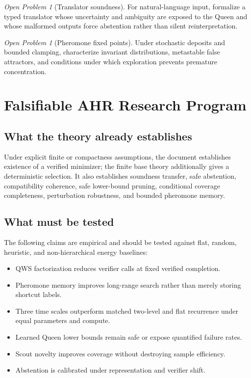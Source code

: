 \documentclass[11pt,oneside]{book}
\theoremstyle{remark}
\newtheorem{openproblem}[definition]{Open Problem}
\begin{document}
\begin{openproblem}[Translator soundness]
For natural-language input, formalize a typed translator whose uncertainty and ambiguity are exposed to the Queen and whose malformed outputs force abstention rather than silent reinterpretation.
\end{openproblem}

\begin{openproblem}[Pheromone fixed points]
Under stochastic deposits and bounded clamping, characterize invariant distributions, metastable false attractors, and conditions under which exploration prevents premature concentration.
\end{openproblem}

\chapter{Falsifiable AHR Research Program}

\section{What the theory already establishes}

Under explicit finite or compactness assumptions, the document establishes
existence of a verified minimizer; the finite base theory additionally gives a
deterministic selection. It also establishes soundness transfer, safe
abstention, compatibility coherence, safe lower-bound pruning, conditional
coverage completeness, perturbation robustness, and bounded pheromone memory.

\section{What must be tested}

The following claims are empirical and should be tested against flat, random, heuristic, and non-hierarchical energy baselines:

\begin{itemize}
  \item QWS factorization reduces verifier calls at fixed verified completion.
  \item Pheromone memory improves long-range search rather than merely storing shortcut labels.
  \item Three time scales outperform matched two-level and flat recurrence under equal parameters and compute.
  \item Learned Queen lower bounds remain safe or expose quantified failure rates.
  \item Scout novelty improves coverage without destroying sample efficiency.
  \item Abstention is calibrated under representation and verifier shift.
\end{itemize}
\end{document}

